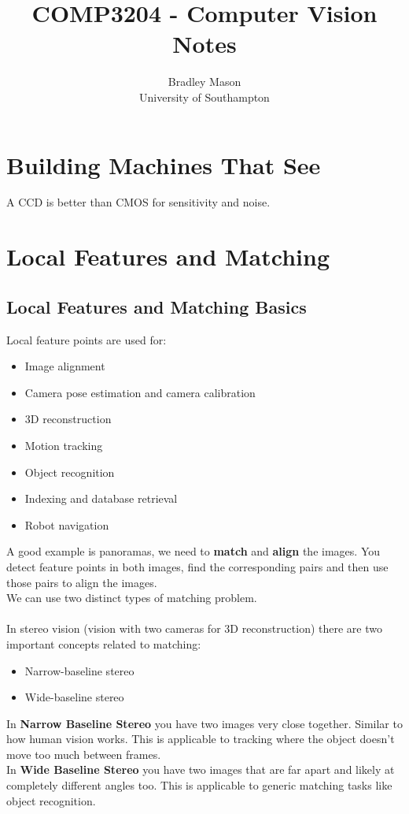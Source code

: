 \documentclass{article}
\begin{document}
	\title{COMP3204 - Computer Vision\\Notes}
	\author{Bradley Mason\\ University of Southampton}
	\maketitle
	\newpage
	
	\tableofcontents
	\newpage
	\section*{Building Machines That See}
	\pagestyle{headings}
	A CCD is better than CMOS for sensitivity and noise.
	
	\newpage
	\section*{Local Features and Matching}
	\pagestyle{headings}
	\subsection*{Local Features and Matching Basics}
	Local feature points are used for:
	\begin{itemize}
		\item Image alignment
		\item Camera pose estimation and camera calibration
		\item 3D reconstruction
		\item Motion tracking
		\item Object recognition
		\item Indexing and database retrieval
		\item Robot navigation
	\end{itemize}
	A good example is panoramas, we need to {\bfseries match} and {\bfseries align} the images. You detect feature points in both images, find the corresponding pairs and then use those pairs to align the images.\\
	We can use two distinct types of matching problem.\\
	\\
	In stereo vision (vision with two cameras for 3D reconstruction) there are two important concepts related to matching:
	\begin{itemize}
		\item Narrow-baseline stereo
		\item Wide-baseline stereo
	\end{itemize}
	In {\bfseries Narrow Baseline Stereo} you have two images very close together. Similar to how human vision works. This is applicable to tracking where the object doesn't move too much between frames.\\
	In {\bfseries Wide Baseline Stereo} you have two images that are far apart and likely at completely different angles too. This is applicable to generic matching tasks like object recognition.
	
\end{document}
